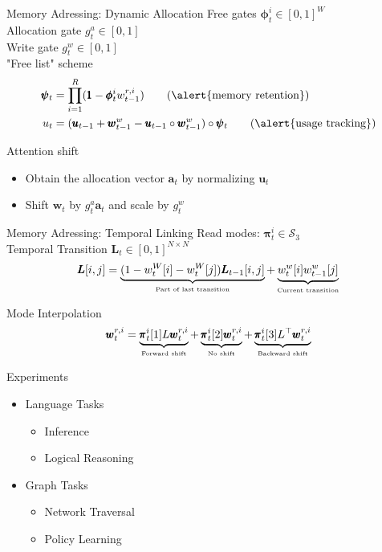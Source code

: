 \documentclass{beamer}
\begin{document}
\begin{frame}{Memory Adressing: Dynamic Allocation}
	\alert{Free gates} $\pmb{\phi}_t^i \in [0,1]^W$\\
	\alert{Allocation gate} $g_t^a \in [0,1]$\\
	\alert{Write gate} $g_t^w \in [0,1]$\\
	
	\alert{"Free list" scheme}
	\begin{align*}
	\pmb{\psi}_t &= \prod\limits_{i=1}^R (\pmb{1} - \pmb{\phi}_t^iw_{t-1}^{r,i}) \tag{\alert{memory retention}}\\
	u_t &= (\pmb{u}_{t-1} + \pmb{w}_{t-1}^w - \pmb{u}_{t-1} \circ \pmb{w}_{t-1}^w) \circ \pmb{\psi}_t \tag{\alert{usage tracking}}\\
	\end{align*}
	
	\pause
	\alert{Attention shift} 
	\begin{itemize}
	\item Obtain the \alert{allocation vector} $\pmb{a}_t$ by normalizing $\pmb{u}_t$\\
	\item \alert{Shift} $\pmb{w}_t$ by $g_t^a\pmb{a}_t$ and \alert{scale} by $g_t^w$
	\end{itemize}
\end{frame}

\begin{frame}{Memory Adressing: Temporal Linking}
	\alert{Read modes}: $\pmb{\pi}_t^i \in \mathcal{S}_3$\\
	
	\pause
	\alert{Temporal Transition} $\pmb{L}_t \in [0,1]^{N\times N}$
	\[
	\pmb{L}[i,j] = \underbrace{(1 - w_t^W[i] - w_t^W[j])\pmb{L}_{t-1}[i,j]}_{\text{\tiny{{Part of last transition}}}} + \underbrace{w_t^w[i]w_{t-1}^w[j]}_{\text{\tiny{Current transition}}}
	\]
	
	\pause
	\alert{Mode Interpolation}
	\[
	\pmb{w}_t^{r,i} = 
					\underbrace{\pmb{\pi}_t^i[1]L\pmb{w}_t^{r,i}}_{\text{\tiny{Forward shift}}} + 
					\underbrace{\pmb{\pi}_t^i[2]\pmb{w}_t^{r,i}}_{\text{\tiny{No shift}}} + 
					\underbrace{\pmb{\pi}_t^i[3]L^\top\pmb{w}_t^{r,i}}_{\text{\tiny{Backward shift}}} 
	\]
\end{frame}

\begin{frame}{Experiments}
	\begin{itemize}
	\item \alert{Language Tasks}
	\begin{itemize}
	\item Inference
	\item Logical Reasoning
	\end{itemize}
	\pause
	\item \alert{Graph Tasks}
	\begin{itemize}
	\item Network Traversal
	\item Policy Learning
	\end{itemize}
	\end{itemize}
\end{frame}
\end{document}
